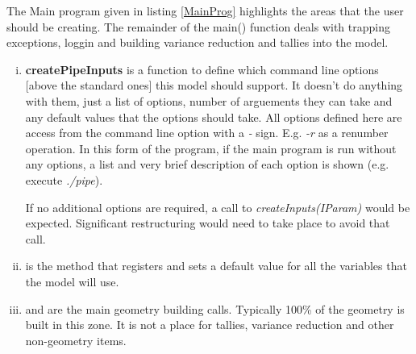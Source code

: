 The Main program given in listing \ref{MainProg} highlights the areas
that the user should be creating. The remainder of the main() function
deals with trapping exceptions, loggin and building variance reduction
and tallies into the model.

\begin{enumerate}[(i)]
\item {\bf createPipeInputs} is a 
function to define which command line options [above the standard ones]
this model should support. It doesn't do anything with them, just a
list of options, number of arguements they can take and any default
values that the options should take. All options defined here are
access from the command line option with a {\it -} sign. E.g. {\it -r} as a
renumber operation. In this form of the program, if the main program
is run without any options, a list and very brief description of each
option is shown (e.g. execute {\it ./pipe}).

If no additional options are required, a call to
{\it createInputs(IParam)} would be expected. Significant restructuring
would need to take place to avoid that call.
\item {} is the method that registers
and sets a default value for all the variables that the model will
use. 
\item {} and  are the
main geometry building calls. Typically 100\% of the geometry is built
in this zone. It is not a place for tallies, variance reduction and other
non-geometry items.
\end{enumerate}



